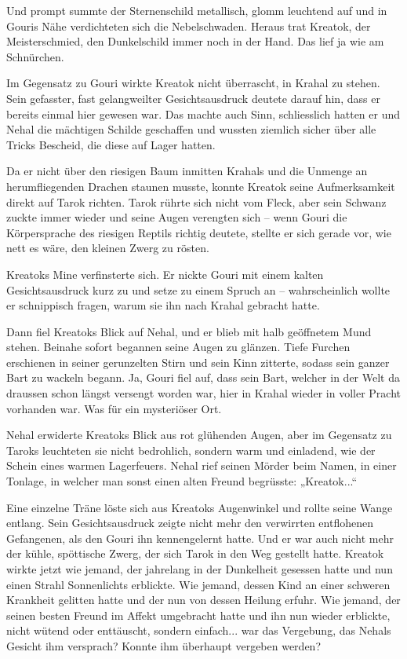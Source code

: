 Und prompt summte der Sternenschild metallisch, glomm leuchtend auf und in Gouris Nähe verdichteten sich die Nebelschwaden. Heraus trat Kreatok, der Meisterschmied, den Dunkelschild immer noch in der Hand. Das lief ja wie am Schnürchen.

Im Gegensatz zu Gouri wirkte Kreatok nicht überrascht, in Krahal zu stehen. Sein gefasster, fast gelangweilter Gesichtsausdruck deutete darauf hin, dass er bereits einmal hier gewesen war. Das machte auch Sinn, schliesslich hatten er und Nehal die mächtigen Schilde geschaffen und wussten ziemlich sicher über alle Tricks Bescheid, die diese auf Lager hatten.

Da er nicht über den riesigen Baum inmitten Krahals und die Unmenge an herumfliegenden Drachen staunen musste, konnte Kreatok seine Aufmerksamkeit direkt auf Tarok richten. Tarok rührte sich nicht vom Fleck, aber sein Schwanz zuckte immer wieder und seine Augen verengten sich – wenn Gouri die Körpersprache des riesigen Reptils richtig deutete, stellte er sich gerade vor, wie nett es wäre, den kleinen Zwerg zu rösten.

Kreatoks Mine verfinsterte sich. Er nickte Gouri mit einem kalten Gesichtsausdruck kurz zu und setze zu einem Spruch an – wahrscheinlich wollte er schnippisch fragen, warum sie ihn nach Krahal gebracht hatte.

Dann fiel Kreatoks Blick auf Nehal, und er blieb mit halb geöffnetem Mund stehen. Beinahe sofort begannen seine Augen zu glänzen. Tiefe Furchen erschienen in seiner gerunzelten Stirn und sein Kinn zitterte, sodass sein ganzer Bart zu wackeln begann. Ja, Gouri fiel auf, dass sein Bart, welcher in der Welt da draussen schon längst versengt worden war, hier in Krahal wieder in voller Pracht vorhanden war. Was für ein mysteriöser Ort.

Nehal erwiderte Kreatoks Blick aus rot glühenden Augen, aber im Gegensatz zu Taroks leuchteten sie nicht bedrohlich, sondern warm und einladend, wie der Schein eines warmen Lagerfeuers. Nehal rief seinen Mörder beim Namen, in einer Tonlage, in welcher man sonst einen alten Freund begrüsste: „Kreatok...“

Eine einzelne Träne löste sich aus Kreatoks Augenwinkel und rollte seine Wange entlang. Sein Gesichtsausdruck zeigte nicht mehr den verwirrten entflohenen Gefangenen, als den Gouri ihn kennengelernt hatte. Und er war auch nicht mehr der kühle, spöttische Zwerg, der sich Tarok in den Weg gestellt hatte. Kreatok wirkte jetzt wie jemand, der jahrelang in der Dunkelheit gesessen hatte und nun einen Strahl Sonnenlichts erblickte. Wie jemand, dessen Kind an einer schweren Krankheit gelitten hatte und der nun von dessen Heilung erfuhr. Wie jemand, der seinen besten Freund im Affekt umgebracht hatte und ihn nun wieder erblickte, nicht wütend oder enttäuscht, sondern einfach... war das Vergebung, das Nehals Gesicht ihm versprach? Konnte ihm überhaupt vergeben werden?

